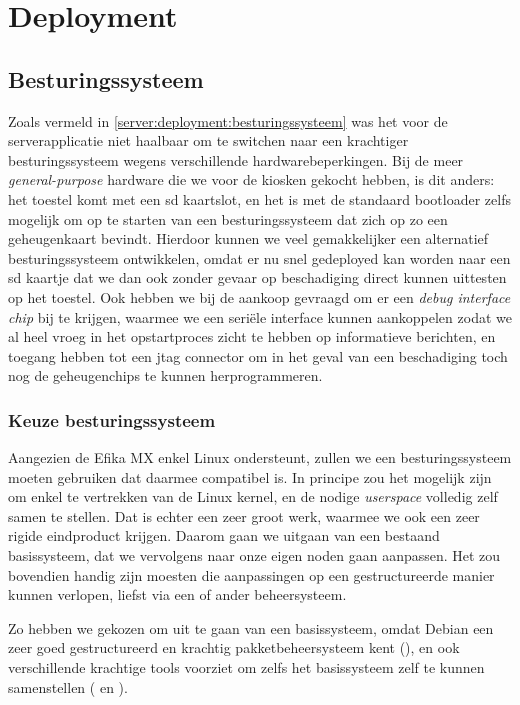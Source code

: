\chapter{Deployment}
\label{kiosk:deployment}

\section{Besturingssysteem}
\label{kiosk:deployment:besturingssysteem}

Zoals vermeld in \ref{server:deployment:besturingssysteem} was het voor de serverapplicatie niet haalbaar om te switchen naar een krachtiger besturingssysteem wegens verschillende hardwarebeperkingen. Bij de meer \emph{general-purpose} hardware die we voor de kiosken gekocht hebben, is dit anders: het toestel komt met een \ac{sd} kaartslot, en het is met de standaard bootloader zelfs mogelijk om op te starten van een besturingssysteem dat zich op zo een geheugenkaart bevindt. Hierdoor kunnen we veel gemakkelijker een alternatief besturingssysteem ontwikkelen, omdat er nu snel gedeployed kan worden naar een \ac{sd} kaartje dat we dan ook zonder gevaar op beschadiging direct kunnen uittesten op het toestel. Ook hebben we bij de aankoop gevraagd om er een \emph{debug interface chip} bij te krijgen, waarmee we een seriële interface kunnen aankoppelen zodat we al heel vroeg in het opstartproces zicht te hebben op informatieve berichten, en toegang hebben tot een \ac{jtag} connector om in het geval van een beschadiging toch nog de geheugenchips te kunnen herprogrammeren.

\subsection{Keuze besturingssysteem}
\label{kiosk:deployment:besturingssysteem:keuze}

Aangezien de Efika MX enkel Linux ondersteunt, zullen we een besturingssysteem moeten gebruiken dat daarmee compatibel is. In principe zou het mogelijk zijn om enkel te vertrekken van de Linux kernel, en de nodige \emph{userspace} volledig zelf samen te stellen. Dat is echter een zeer groot werk, waarmee we ook een zeer rigide eindproduct krijgen. Daarom gaan we uitgaan van een bestaand basissysteem, dat we vervolgens naar onze eigen noden gaan aanpassen. Het zou bovendien handig zijn moesten die aanpassingen op een gestructureerde manier kunnen verlopen, liefst via een of ander beheersysteem.

Zo hebben we gekozen om uit te gaan van een  basissysteem, omdat Debian een zeer goed gestructureerd en krachtig pakketbeheersysteem kent (), en ook verschillende krachtige tools voorziet om zelfs het basissysteem zelf te kunnen samenstellen ( en ).

